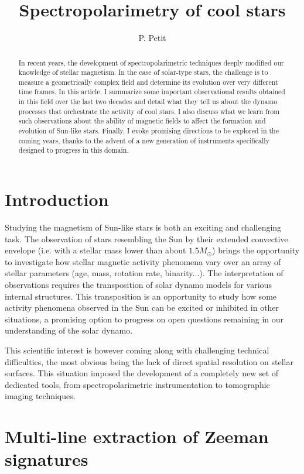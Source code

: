 \documentclass[11pt,twoside]{article}
\begin{document}
\title{Spectropolarimetry of cool stars} 
\author{P. Petit}  

\begin{abstract} 
In recent years, the development of spectropolarimetric techniques deeply modified our knowledge of stellar magnetism. In the case of solar-type stars, the challenge is to measure a geometrically complex field and determine its evolution over very different time frames. In this article, I summarize some important observational results obtained in this field over the last two decades and detail what they tell us about the dynamo processes that orchestrate the activity of cool stars. I also discuss what we learn from such observations about the ability of magnetic fields to affect the formation and evolution of Sun-like stars. Finally, I evoke promising directions to be explored in the coming years, thanks to the advent of a new generation of instruments specifically designed to progress in this domain.
\end{abstract}

\section{Introduction}  

Studying the magnetism of Sun-like stars is both an exciting and challenging task. The observation of stars resembling the Sun by their extended convective envelope (i.e. with a stellar mass lower than about $1.5 M_\odot$) brings the opportunity to investigate how stellar magnetic activity phenomena vary over an array of stellar parameters (age, mass, rotation rate, binarity...). The interpretation of observations requires the transposition of solar dynamo models for various internal structures. This transposition is an opportunity to study how some activity phenomena observed in the Sun can be excited or inhibited in other situations, a promising option to progress on open questions remaining in our understanding of the solar dynamo. 

This scientific interest is however coming along with challenging technical difficulties, the most obvious being the lack of direct spatial resolution on stellar surfaces. This situation imposed the development of a completely new set of dedicated tools, from spectropolarimetric instrumentation to tomographic imaging techniques.  

\section{Multi-line extraction of Zeeman signatures}
\end{document}
